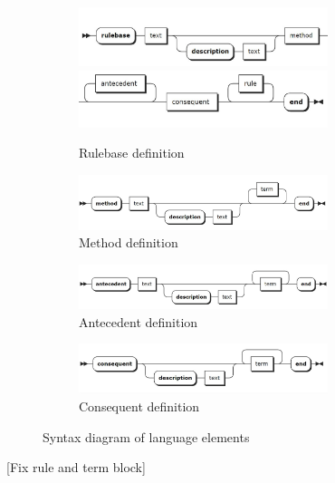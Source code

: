 \begin{figure}[!h]
	\centering
	\begin{subfigure}[b]{0.8\textwidth}
		\centering
        	\includegraphics[width=0.8\textwidth]{images/rulebase_1}
		\includegraphics[width=0.8\textwidth]{images/rulebase_2}
        	\caption{Rulebase definition}
    \end{subfigure}
	
	\begin{subfigure}[b]{0.9\textwidth}
        	\centering
        	\includegraphics[width=0.8\textwidth]{images/method}
		\caption{Method definition}
    \end{subfigure}
    
    \begin{subfigure}[b]{0.9\textwidth}
        	\centering
        	\includegraphics[width=0.8\textwidth]{images/antecedent}
		\caption{Antecedent definition}
    \end{subfigure}
    
    \begin{subfigure}[b]{0.9\textwidth}
        	\centering
        	\includegraphics[width=0.8\textwidth]{images/consequent}
		\caption{Consequent definition}
    \end{subfigure}
    
	\caption{Syntax diagram of language elements}
\end{figure}

[Fix rule and term block]
